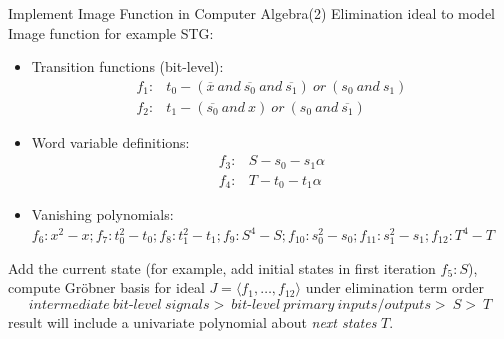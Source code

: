 \documentclass[xcolor=dvipsnames]{beamer}
\begin{document}
\begin{frame}{\large{Implement Image Function in Computer Algebra(2)}}
Elimination ideal to model Image function for example STG:
\begin{itemize}
\item Transition functions (bit-level): \\ \vspace{-5mm}
\begin{displaymath}
\begin{array}{ll}
f_1:& t_0 - (\overline{x}\ and\ \overline{s_0}\ and\ \overline{s_1})\ or\ (s_0\ and\ s_1) \\
f_2:& t_1 - (\overline{s_0}\ and\ x)\ or\ (s_0\ and\ \overline{s_1})\
\end{array}
\end{displaymath}
\item Word variable definitions:\\ \vspace{-5mm}
\begin{displaymath}
\begin{array}{ll}
f_3:& S - s_0 - s_1\alpha \\
f_4:& T - t_0 - t_1\alpha
\end{array}
\end{displaymath}
\item Vanishing polynomials: $f_6: x^2 - x; f_7: t_0^2 - t_0; f_8: t_1^2 - t_1; f_9: S^4 - S; f_{10}: s_0^2 - s_0;
f_{11}: s_1^2 - s_1; f_{12}: T^4 - T$
\end{itemize}
Add the current state (for example, add initial states in first iteration $f_5: S$), compute Gr\"obner basis
for ideal $J = \langle f_1,\dots, f_{12}\rangle$ under elimination term order $$intermediate\ bit\text{-}level\ signals >\ bit\text{-}level\ primary\ inputs/outputs >\ S >\ T$$
  result will include a univariate polynomial about \emph{next states} $T$.
\end{frame}
\end{document}
